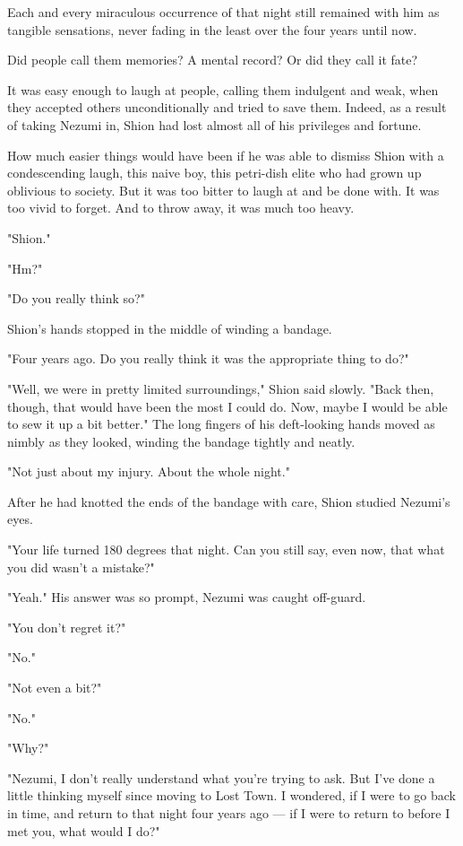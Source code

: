 Each and every miraculous occurrence of that night still remained with
him as tangible sensations, never fading in the least over the four
years until now.

Did people call them memories? A mental record? Or did they call it
fate?

It was easy enough to laugh at people, calling them indulgent and weak,
when they accepted others unconditionally and tried to save them.
Indeed, as a result of taking Nezumi in, Shion had lost almost all of
his privileges and fortune.

How much easier things would have been if he was able to dismiss Shion
with a condescending laugh, this naive boy, this petri-dish elite who
had grown up oblivious to society. But it was too bitter to laugh at and
be done with. It was too vivid to forget. And to throw away, it was much
too heavy.

"Shion."

"Hm?"

"Do you really think so?"

Shion's hands stopped in the middle of winding a bandage.

"Four years ago. Do you really think it was the appropriate thing to
do?"

"Well, we were in pretty limited surroundings," Shion said slowly. "Back
then, though, that would have been the most I could do. Now, maybe I
would be able to sew it up a bit better." The long fingers of his
deft-looking hands moved as nimbly as they looked, winding the bandage
tightly and neatly.

"Not just about my injury. About the whole night."

After he had knotted the ends of the bandage with care, Shion studied
Nezumi's eyes.

"Your life turned 180 degrees that night. Can you still say, even now,
that what you did wasn't a mistake?"

"Yeah." His answer was so prompt, Nezumi was caught off-guard.

"You don't regret it?"

"No."

"Not even a bit?"

"No."

"Why?"

"Nezumi, I don't really understand what you're trying to ask. But I've
done a little thinking myself since moving to Lost Town. I wondered, if
I were to go back in time, and return to that night four years ago --- if
I were to return to before I met you, what would I do?"

